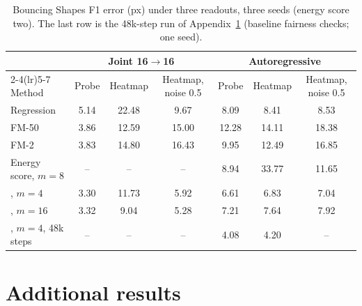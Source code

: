 \begin{table}[h]
\caption{Bouncing Shapes F1 error (px) under three readouts, three seeds (energy score two). The last row is the 48k-step run of Appendix~\ref{app:more} (baseline fairness checks; one seed).}
\label{tab:readout}
\begin{center}
\small
\setlength{\tabcolsep}{5pt}
\begin{tabular}{lcccccc}
\toprule
 & \multicolumn{3}{c}{Joint 16$\to$16} & \multicolumn{3}{c}{Autoregressive} \\
\cmidrule(lr){2-4}\cmidrule(lr){5-7}
Method & Probe & Heatmap & Heatmap, noise 0.5 & Probe & Heatmap & Heatmap, noise 0.5 \\
\midrule
Regression & 5.14 & 22.48 & 9.67 & 8.09 & 8.41 & 8.53 \\
FM-50 & 3.86 & 12.59 & 15.00 & 12.28 & 14.11 & 18.38 \\
FM-2 & 3.83 & 14.80 & 16.43 & 9.95 & 12.49 & 16.85 \\
Energy score, $m{=}8$ & -- & -- & -- & 8.94 & 33.77 & 11.65 \\
\imlewm{}, $m{=}4$ & 3.30 & 11.73 & 5.92 & 6.61 & 6.83 & 7.04 \\
\imlewm{}, $m{=}16$ & 3.32 & 9.04 & 5.28 & 7.21 & 7.64 & 7.92 \\
\imlewm{}, $m{=}4$, 48k steps & -- & -- & -- & 4.08 & 4.20 & -- \\
\bottomrule
\end{tabular}
\end{center}
\end{table}

\FloatBarrier
\section{Additional results}
\label{app:more}

